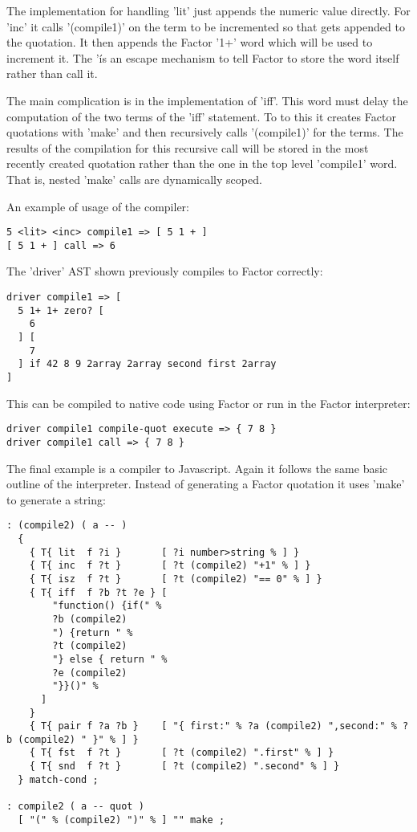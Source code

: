 The implementation for handling 'lit' just appends the numeric value
directly. For 'inc' it calls '(compile1)' on the term to be
incremented so that gets appended to the quotation. It then appends
the Factor '1+' word which will be used to increment it. The '\' is an
escape mechanism to tell Factor to store the word itself rather than
call it.

The main complication is in the implementation of 'iff'. This word
must delay the computation of the two terms of the 'iff' statement. To
to this it creates Factor quotations with 'make' and then recursively
calls '(compile1)' for the terms. The results of the compilation for
this recursive call will be stored in the most recently created
quotation rather than the one in the top level 'compile1' word. That
is, nested 'make' calls are dynamically scoped.

An example of usage of the compiler:

\begin{verbatim}
5 <lit> <inc> compile1 => [ 5 1 + ] 
[ 5 1 + ] call => 6
\end{verbatim}

The 'driver' AST shown previously compiles to Factor correctly:

\begin{verbatim}
driver compile1 => [
  5 1+ 1+ zero? [
    6
  ] [ 
    7
  ] if 42 8 9 2array 2array second first 2array
]
\end{verbatim}

This can be compiled to native code using Factor or run in the Factor
interpreter:

\begin{verbatim}
driver compile1 compile-quot execute => { 7 8 }
driver compile1 call => { 7 8 }
\end{verbatim}

The final example is a compiler to Javascript. Again it follows the
same basic outline of the interpreter. Instead of generating a Factor
quotation it uses 'make' to generate a string:

\begin{verbatim}
: (compile2) ( a -- )
  {
    { T{ lit  f ?i }       [ ?i number>string % ] }
    { T{ inc  f ?t }       [ ?t (compile2) "+1" % ] }
    { T{ isz  f ?t }       [ ?t (compile2) "== 0" % ] }
    { T{ iff  f ?b ?t ?e } [ 
        "function() {if(" % 
        ?b (compile2) 
        ") {return " % 
        ?t (compile2)
        "} else { return " %
        ?e (compile2)
        "}}()" %
      ] 
    }
    { T{ pair f ?a ?b }    [ "{ first:" % ?a (compile2) ",second:" % ?b (compile2) " }" % ] }
    { T{ fst  f ?t }       [ ?t (compile2) ".first" % ] }
    { T{ snd  f ?t }       [ ?t (compile2) ".second" % ] }
  } match-cond ;  

: compile2 ( a -- quot )
  [ "(" % (compile2) ")" % ] "" make ;
\end{verbatim}

